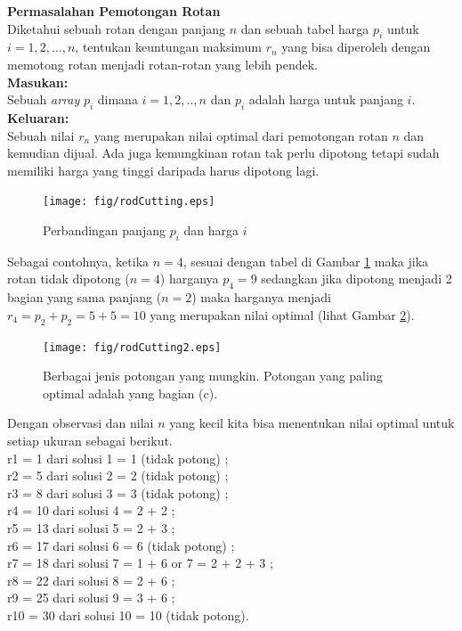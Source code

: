 \begin{contoh}
\textbf{Permasalahan Pemotongan Rotan}\\
Diketahui sebuah rotan dengan panjang $n$ dan sebuah tabel harga $p_i$ untuk $i=1,2,\ldots,n$, tentukan keuntungan maksimum $r_n$ yang bisa diperoleh dengan memotong rotan menjadi rotan-rotan yang lebih pendek. \\
\textbf{Masukan:}\\
Sebuah \textit{array} $p_i$ dimana $i=1,2,..,n$ dan $p_i$ adalah harga untuk panjang $i$.\\
\textbf{Keluaran:}\\
Sebuah nilai $r_n$ yang merupakan nilai optimal dari pemotongan rotan $n$ dan kemudian dijual. Ada juga kemungkinan rotan tak perlu dipotong tetapi sudah memiliki harga yang tinggi daripada harus dipotong lagi.\\
\end{contoh}

\begin{figure}
\centering
\texttt{[image: fig/rodCutting.eps]}%
\caption{Perbandingan panjang $p_i$ dan harga $i$}%
\label{fig:rodCutting}%
\end{figure}


Sebagai contohnya, ketika $n=4$, sesuai dengan tabel di Gambar \ref{fig:rodCutting} maka jika rotan tidak dipotong ($n=4$) harganya $p_4 = 9$ sedangkan jika dipotong menjadi 2 bagian yang sama panjang ($n=2$) maka harganya menjadi $r_4=p_2+p_2=5+5=10$ yang merupakan nilai optimal (lihat Gambar \ref{fig:rodCutting2}).   

\begin{figure}
\centering
\texttt{[image: fig/rodCutting2.eps]}%
\caption{Berbagai jenis potongan yang mungkin. Potongan yang paling optimal adalah yang bagian (c).}%
\label{fig:rodCutting2}%
\end{figure}

Dengan observasi dan nilai $n$ yang kecil kita bisa menentukan nilai optimal untuk setiap ukuran sebagai berikut. \\
r1 = 1 dari solusi 1 = 1 (tidak potong) ;\\
r2 = 5 dari solusi 2 = 2 (tidak potong) ;\\
r3 = 8 dari solusi 3 = 3 (tidak potong) ;\\
r4 = 10 dari solusi 4 = 2 + 2 ;\\
r5 = 13 dari solusi 5 = 2 + 3 ;\\
r6 = 17 dari solusi 6 = 6 (tidak potong) ;\\
r7 = 18 dari solusi 7 = 1 + 6 or 7 = 2 + 2 + 3 ;\\
r8 = 22 dari solusi 8 = 2 + 6 ;\\
r9 = 25 dari solusi 9 = 3 + 6 ;\\
r10 = 30 dari solusi 10 = 10 (tidak potong).

